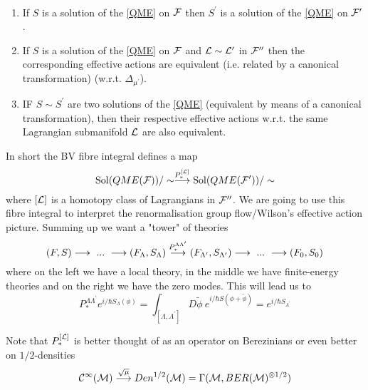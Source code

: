 \begin{corollary}~
  \begin{enumerate}
    \item If $S$ is a solution of the \eqref{QME} on ${\mathcal{F}}$ then $S^\prime$ is a solution of the \eqref{QME} on ${\mathcal{F}}^\prime$.

    \item If $S$ is a solution of the \eqref{QME} on ${\mathcal{F}}$ and $\mathcal{L} \sim \mathcal{L}^\prime$ in ${\mathcal{F}}^{\prime\prime}$ then the corresponding effective actions are equivalent (i.e. related by a canonical transformation) (w.r.t. $\Delta_{\mu^\prime}$).

    \item IF $S \sim S^\prime$ are two solutions of the \eqref{QME} (equivalent by means of a canonical transformation), then their respective effective actions w.r.t. the same Lagrangian submanifold $\mathcal{L}$ are also equivalent.
  \end{enumerate}
\end{corollary}

In short the BV fibre integral defines a map
\begin{equation}
  \operatorname{Sol}(QME({\mathcal{F}}))/\sim \overset{P_*^{[\mathcal{L}]}}{\longrightarrow} \operatorname{Sol}(QME({\mathcal{F}}^\prime))/\sim
\end{equation}
where $[\mathcal{L}]$ is a homotopy class of Lagrangians in ${\mathcal{F}}^{\prime\prime}$. We are going to use this fibre integral to interpret the renormalisation group flow/Wilson's effective action picture. Summing up we want a "tower" of theories
\begin{equation}
  (F,S) \longrightarrow \ ... \ \longrightarrow (F_\Lambda, S_\Lambda) \overset{P_*^{\Lambda \Lambda^\prime}}{\longrightarrow} (F_{\Lambda^\prime}, S_{\Lambda^\prime}) \longrightarrow \ ... \ \longrightarrow (F_0, S_0)
\end{equation}
where on the left we have a local theory, in the middle we have finite-energy theories and on the right we have the zero modes. This will lead us to
\begin{equation}
  P_*^{\Lambda \Lambda^\prime} e^{i/\hbar S_\Lambda(\phi)} = \int_{[\Lambda, \Lambda^\prime]} D\widetilde{\phi} \ e^{i/\hbar S(\phi + \widetilde{\phi})} = e^{i/\hbar S_{\Lambda^\prime}}
\end{equation}

\begin{rem}
  Note that $P_*^{[\mathcal{L}]}$ is better thought of as an operator on Berezinians or even better on $1/2$-densities
  \begin{equation}
    \mathcal{C}^{\infty}(\mathcal{M}) \overset{\sqrt{\mu}}{\longrightarrow} Den^{1/2}(\mathcal{M}) = \Gamma(\mathcal{M}, BER(\mathcal{M})^{\otimes 1/2})
  \end{equation}
\end{rem}


